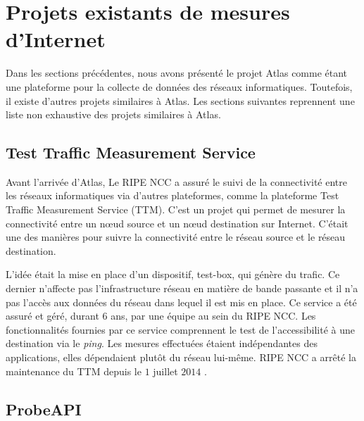 

\section{Projets existants de mesures d'Internet}

Dans les sections précédentes, nous avons présenté  le projet  Atlas comme étant une plateforme pour la collecte de données des réseaux informatiques.  Toutefois, il existe d'autres projets similaires à  Atlas. Les sections suivantes reprennent une liste non exhaustive des projets similaires  à  Atlas.

\subsection{Test Traffic Measurement Service}

Avant l'arrivée d'Atlas, Le RIPE NCC a assuré le suivi de la connectivité entre les réseaux informatiques via  d'autres plateformes, comme la plateforme Test Traffic Measurement Service (TTM). C'est un projet qui permet de mesurer la connectivité entre un n\oe{}ud  source  et  un n\oe{}ud destination sur Internet.  C'était une des manières  pour  suivre la connectivité entre le réseau source et le réseau destination. 

L'idée était la mise en place d'un dispositif, test-box,  qui génère du trafic. Ce dernier n'affecte pas l'infrastructure réseau en matière de bande passante et il n'a pas l'accès aux données du réseau dans lequel il est mis en place.
Ce service a été assuré et géré, durant $6$ ans, par une équipe au sein du RIPE NCC. Les fonctionnalités fournies par ce service comprennent le test de l'accessibilité à une destination via le \textit{ping}. Les mesures effectuées étaient indépendantes des applications, elles dépendaient plutôt du  réseau lui-même. RIPE NCC   a  arrêté la maintenance du  TTM depuis le $1$ juillet $2014$ \cite{TTM}.


\subsection{ProbeAPI}

